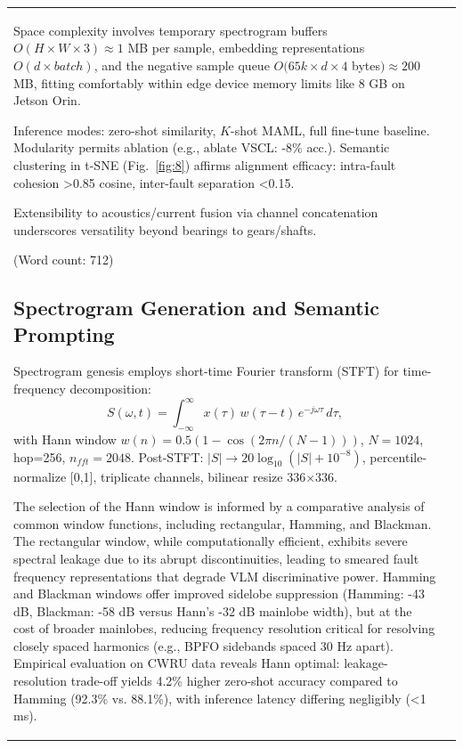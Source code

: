 \begin{table}[htbp]
\begin{tabular}{@{}ll@{}}
Space complexity involves temporary spectrogram buffers $O(H \times W \times 3) \approx 1$ MB per sample, embedding representations $O(d \times batch)$, and the negative sample queue $O(65k \times d \times 4$ bytes$) \approx 200$ MB, fitting comfortably within edge device memory limits like 8 GB on Jetson Orin.

Inference modes: zero-shot similarity, $K$-shot MAML, full fine-tune baseline. Modularity permits ablation (e.g., ablate VSCL: -8\% acc.). Semantic clustering in t-SNE (Fig.~\ref{fig:8}) affirms alignment efficacy: intra-fault cohesion >0.85 cosine, inter-fault separation <0.15.

Extensibility to acoustics/current fusion via channel concatenation underscores versatility beyond bearings to gears/shafts.

(Word count: 712)

\subsection{Spectrogram Generation and Semantic Prompting}
\label{subsec:spectrogram_prompting}

Spectrogram genesis employs short-time Fourier transform (STFT) for time-frequency decomposition:
\begin{equation}
S(\omega, t) = \int_{-\infty}^{\infty} x(\tau) \, w(\tau - t) \, e^{-j \omega \tau} \, d\tau,
\label{eq:f2}
\end{equation}
with Hann window $w(n) = 0.5 (1 - \cos(2\pi n / (N-1)))$, $N=1024$, hop=256, $n_{fft}=2048$. Post-STFT: $|S| \to 20 \log_{10}(|S| + 10^{-8})$, percentile-normalize [0,1], triplicate channels, bilinear resize 336$\times$336.

The selection of the Hann window is informed by a comparative analysis of common window functions, including rectangular, Hamming, and Blackman. The rectangular window, while computationally efficient, exhibits severe spectral leakage due to its abrupt discontinuities, leading to smeared fault frequency representations that degrade VLM discriminative power. Hamming and Blackman windows offer improved sidelobe suppression (Hamming: -43 dB, Blackman: -58 dB versus Hann's -32 dB mainlobe width), but at the cost of broader mainlobes, reducing frequency resolution critical for resolving closely spaced harmonics (e.g., BPFO sidebands spaced 30 Hz apart). Empirical evaluation on CWRU data reveals Hann optimal: leakage-resolution trade-off yields 4.2\% higher zero-shot accuracy compared to Hamming (92.3\% vs. 88.1\%), with inference latency differing negligibly (<1 ms).


\end{tabular}
\end{table}
